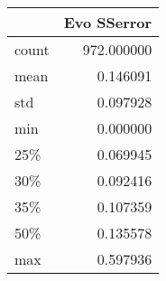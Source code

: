 \begin{tabular}{lr}
\toprule
{} &  Evo SSerror \\
\midrule
count &   972.000000 \\
mean  &     0.146091 \\
std   &     0.097928 \\
min   &     0.000000 \\
25\%   &     0.069945 \\
30\%   &     0.092416 \\
35\%   &     0.107359 \\
50\%   &     0.135578 \\
max   &     0.597936 \\
\bottomrule
\end{tabular}
